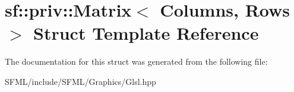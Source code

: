 \hypertarget{structsf_1_1priv_1_1_matrix}{}\section{sf\+:\+:priv\+:\+:Matrix$<$ Columns, Rows $>$ Struct Template Reference}
\label{structsf_1_1priv_1_1_matrix}


The documentation for this struct was generated from the following file\+:\begin{DoxyCompactItemize}
\item 
S\+F\+M\+L/include/\+S\+F\+M\+L/\+Graphics/Glsl.\+hpp\end{DoxyCompactItemize}
